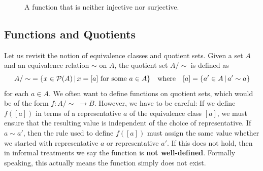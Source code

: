\begin{figure}[H]
	\centering
	\caption{A function that is neither injective nor surjective.}
\end{figure}

\subsection{Functions and Quotients}

Let us revisit the notion of equivalence classes and quotient sets. 
Given a set $A$ and an equivalence relation $\sim$ on $A$, the quotient set $A/\sim$ is defined as
\[ A/\sim\; = \{ x\in\mathcal{P}(A) \,|\, x = [a] \text{ for some } a\in A \} \quad\text{where}\quad [a] = \{ a'\in A \,|\, a'\sim a \} \]
for each $a\in A$. 
We often want to define functions on quotient sets, which would be of the form $f:A/\sim\;\rightarrow B$. 
However, we have to be careful:
If we define $f([a])$ in terms of a representative $a$ of the equivalence class $[a]$, we must ensure that the resulting value is independent of the choice of representative.
If $a\sim a'$, then the rule used to define $f([a])$ must assign the same value whether we started with representative $a$ or representative $a'$.
If this does not hold, then in informal treatments we say the function is \textbf{not well-defined}. 
Formally speaking, this actually means the function simply does not exist. 

